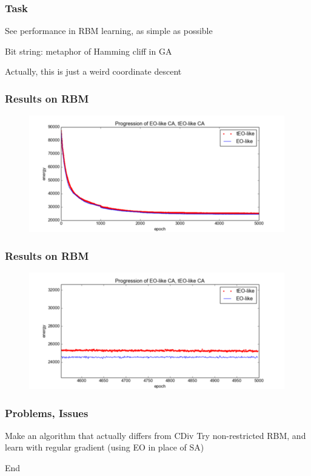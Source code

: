 \documentclass{beamer}
\begin{document}
\begin{frame}
  \frametitle{Task}
  See performance in RBM learning, as simple as possible

  Bit string: metaphor of Hamming cliff in GA

  Actually, this is just a weird coordinate descent
\end{frame}

\begin{frame}
  \frametitle{Results on RBM}
  \begin{figure}
    \includegraphics{eo_rbm_unzoomed}
  \end{figure}
\end{frame}

\begin{frame}
  \frametitle{Results on RBM}
  \begin{figure}
    \includegraphics{eo_rbm_zoomed}
  \end{figure}
\end{frame}

\begin{frame}
  \frametitle{Problems, Issues}
  Make an algorithm that actually differs from CDiv
  Try non-restricted RBM, and learn with regular gradient
  (using EO in place of SA)
\end{frame}

\begin{frame}
  End
\begin{thebibliography}{99}
\end{thebibliography}

\end{frame}
\end{document}
